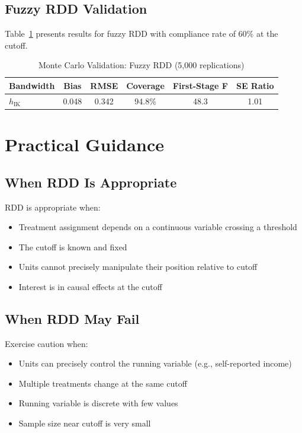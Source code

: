 \subsection{Fuzzy RDD Validation}

Table~\ref{tab:fuzzy_rdd_mc} presents results for fuzzy RDD with compliance rate of 60\% at the cutoff.

\begin{table}[htbp]
\centering
\caption{Monte Carlo Validation: Fuzzy RDD (5,000 replications)}
\label{tab:fuzzy_rdd_mc}
\begin{tabular}{lccccc}
\toprule
\textbf{Bandwidth} & \textbf{Bias} & \textbf{RMSE} & \textbf{Coverage} & \textbf{First-Stage F} & \textbf{SE Ratio} \\
\midrule
$h_{\text{IK}}$ & 0.048 & 0.342 & 94.8\% & 48.3 & 1.01 \\
\bottomrule
\end{tabular}
\end{table}

\section{Practical Guidance}
\label{sec:rdd_practical}

\subsection{When RDD Is Appropriate}

RDD is appropriate when:
\begin{itemize}
    \item Treatment assignment depends on a continuous variable crossing a threshold
    \item The cutoff is known and fixed
    \item Units cannot precisely manipulate their position relative to cutoff
    \item Interest is in causal effects at the cutoff
\end{itemize}

\subsection{When RDD May Fail}

Exercise caution when:
\begin{itemize}
    \item Units can precisely control the running variable (e.g., self-reported income)
    \item Multiple treatments change at the same cutoff
    \item Running variable is discrete with few values
    \item Sample size near cutoff is very small
\end{itemize}


